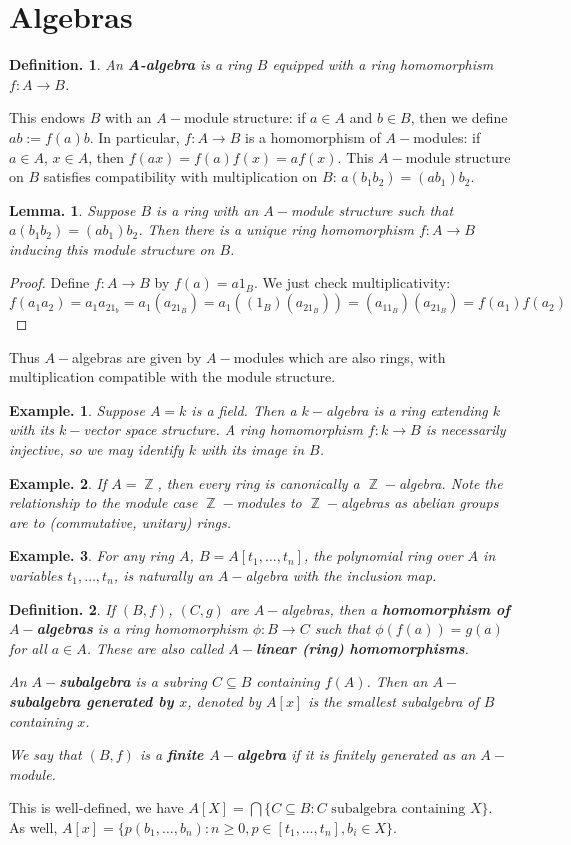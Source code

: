 \documentclass[11pt, a4paper]{memoir}
\DeclareMathOperator{\Z}{{\mathbb{Z}}}
\newcommand{\mbf}[1]{{\boldmath\bfseries #1}}
\theoremstyle{change}
\newtheorem{lemma}[theorem]{Lemma.}
\theoremstyle{plain}
\theoremstyle{nonumberplain}
\newtheorem{definition}{Definition.}
\newtheorem{example}{Example.}
\newtheorem{proof}{Proof}
\numberwithin{equation}{section}
\begin{document}
\section{Algebras}
\begin{definition}
    An \textbf{A-algebra} is a ring $B$ equipped with a ring homomorphism $f:A\to B$.
\end{definition}
This endows $B$ with an $A-$module structure: if $a\in A$ and $b\in B$, then we define $ab:=f(a)b$.
In particular, $f:A\to B$ is a homomorphism of $A-$modules: if $a\in A$, $x\in A$, then $f(ax)=f(a)f(x)=af(x)$.
This $A-$module structure on $B$ satisfies compatibility with multiplication on $B$: $a(b_1b_2)=(ab_1)b_2$.
\begin{lemma}
    Suppose $B$ is a ring with an $A-$module structure such that $a(b_1b_2)=(ab_1)b_2$.
    Then there is a unique ring homomorphism $f:A\to B$ inducing this module structure on $B$.
\end{lemma}
\begin{proof}
    Define $f:A\to B$ by $f(a)=a1_B$.
    We just check multiplicativity:
    \begin{equation*}
        f(a_1a_2)=a_1a_21_b=a_1(a_21_B)=a_1((1_B)(a_21_B))=(a_11_B)(a_21_B)=f(a_1)f(a_2)
    \end{equation*}
\end{proof}
Thus $A-$algebras are given by $A-$modules which are also rings, with multiplication compatible with the module structure.
\begin{example}
    Suppose $A=k$ is a field.
    Then a $k-$algebra is a ring extending $k$ with its $k-$vector space structure.
    A ring homomorphism $f:k\to B$ is necessarily injective, so we may identify $k$ with its image in $B$.
\end{example}
\begin{example}
    If $A=\Z$, then every ring is canonically a $\Z-$algebra.
    Note the relationship to the module case $\Z-$modules to $\Z-$algebras as abelian groups are to (commutative, unitary) rings.
\end{example}
\begin{example}
    For any ring $A$, $B=A[t_1,\ldots,t_n]$, the polynomial ring over $A$ in variables $t_1,\ldots,t_n$, is naturally an $A-$algebra with the inclusion map.
\end{example}

\begin{definition}
    If $(B,f)$, $(C,g)$ are $A-$algebras, then a \mbf{homomorphism of $A-$algebras} is a ring homomorphism $\phi:B\to C$ such that $\phi(f(a))=g(a)$ for all $a\in A$.
    These are also called \mbf{$A-$linear (ring) homomorphisms}.

    An \mbf{$A-$subalgebra} is a subring $C\subseteq B$ containing $f(A)$.
    Then an \mbf{$A-$subalgebra generated by $x$}, denoted by $A[x]$ is the smallest subalgebra of $B$ containing $x$.

    We say that $(B,f)$ is a \mbf{finite $A-$algebra} if it is finitely generated as an $A-$module.
\end{definition}
This is well-defined, we have $A[X]=\bigcap\{C\subseteq B:C\text{ subalgebra containing $X$}\}$.
As well, $A[x]=\{p(b_1,\ldots,b_n):n\geq 0,p\in[t_1,\ldots,t_n],b_i\in X\}$.
\end{document}
